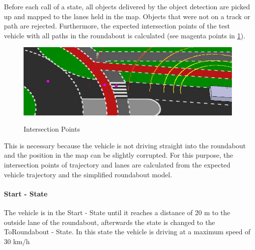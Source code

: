 \documentclass[11pt,oneside,openright]{mpreport}
\begin{document}
Before each call of a state, all objects delivered by the object detection are picked up and mapped to the lanes held in the map.
Objects that were not on a track or path are rejected.
Furthermore, the expected intersection points of the test vehicle with all paths in the roundabout is calculated (see magenta points in \cref{intersection_pos}). 
\begin{figure}[!ht]
\begin{center}
\caption{Intersection Points}
\includegraphics[width=\textwidth]{bilder/intersection_pos.png}
\label{intersection_pos}
\end{center}
\end{figure}
This is necessary because the vehicle is not driving straight into the roundabout and the position in the map can be slightly corrupted. For this purpose,
the intersection points of trajectory and lanes are calculated from the expected vehicle trajectory and the simplified roundabout model.

\paragraph{Start - State}

The vehicle is in the Start - State until it reaches a distance of 20 m to the outside lane of the roundabout, afterwards the state is changed to the ToRoundabout - State.
In this state the vehicle is driving at a maximum speed of 30 km/h
\end{document}
